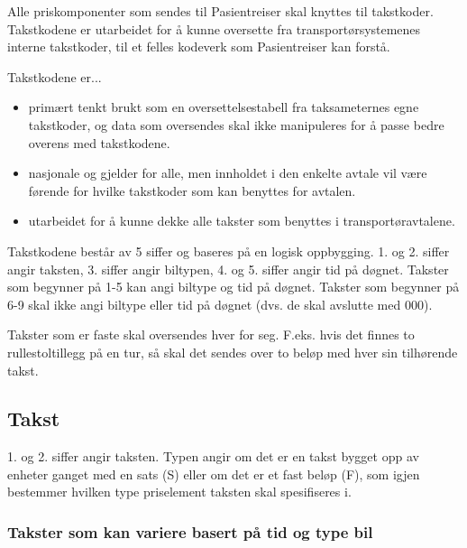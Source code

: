\documentclass[a4paper,titlepage,norsk,11pt]{article}
\begin{document}
Alle priskomponenter som sendes til Pasientreiser skal knyttes til takstkoder. Takstkodene er utarbeidet for å kunne oversette fra transportørsystemenes interne takstkoder, til et felles kodeverk som Pasientreiser kan forstå.

Takstkodene er...
\begin{itemize}
\item primært tenkt brukt som en oversettelsestabell fra taksameternes egne takstkoder, og data som oversendes skal ikke manipuleres for å passe bedre overens med takstkodene.
\item nasjonale og gjelder for alle, men innholdet i den enkelte avtale vil være førende for hvilke takstkoder som kan benyttes for avtalen.
\item utarbeidet for å kunne dekke alle takster som benyttes i transportøravtalene.
\end{itemize}

Takstkodene består av 5 siffer og baseres på en logisk oppbygging. 1. og 2. siffer angir taksten, 3. siffer angir biltypen, 4. og 5. siffer angir tid på døgnet. Takster som begynner på 1-5 kan angi biltype og tid på døgnet. Takster som begynner på 6-9 skal ikke angi biltype eller tid på døgnet (dvs. de skal avslutte med 000).

Takster som er faste skal oversendes hver for seg. F.eks. hvis det finnes to rullestoltillegg på en tur, så skal det sendes over to beløp med hver sin tilhørende takst.

\subsection{Takst}
1. og 2. siffer angir taksten. Typen angir om det er en takst bygget opp av enheter ganget med en sats (S) eller om det er et fast beløp (F), som igjen bestemmer hvilken type priselement taksten skal spesifiseres i.

\subsubsection{Takster som kan variere basert på tid og type bil}
\end{document}
